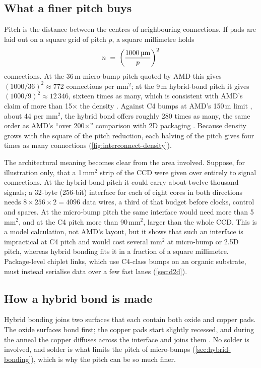 \subsection{What a finer pitch buys}
\label{sec:density-example}
Pitch is the distance between the centres of neighbouring connections. If pads are laid out on a square grid of pitch $p$, a square millimetre holds
\begin{equation}
  n \;=\; \left(\frac{1000\,\text{\textmu m}}{p}\right)^{2}
  \label{eq:pad-density}
\end{equation}
connections. At the 36\,\textmu m micro-bump pitch quoted by AMD this gives $(1000/36)^2 \approx 772$ connections per mm$^2$; at the 9\,\textmu m hybrid-bond pitch it gives $(1000/9)^2 \approx 12\,346$, sixteen times as many, which is consistent with AMD's claim of more than 15$\times$ the density \cite{swaminathanAdvancedPackagingEnabling2021}. Against C4 bumps at AMD's 150\,\textmu m limit \cite[slide~13]{lambertHeterogenousIntegrationHigh2025}, about 44 per mm$^2$, the hybrid bond offers roughly 280 times as many, the same order as AMD's ``over 200$\times$'' comparison with 2D packaging \cite{amd2022epyc7003}. Because density grows with the square of the pitch reduction, each halving of the pitch gives four times as many connections (\cref{fig:interconnect-density}).

The architectural meaning becomes clear from the area involved. Suppose, for illustration only, that a 1\,mm$^2$ strip of the CCD were given over entirely to signal connections. At the hybrid-bond pitch it could carry about twelve thousand signals; a 32-byte (256-bit) interface for each of eight cores in both directions needs $8 \times 256 \times 2 = 4096$ data wires, a third of that budget before clocks, control and spares. At the micro-bump pitch the same interface would need more than 5\,mm$^2$, and at the C4 pitch more than 90\,mm$^2$, larger than the whole CCD. This is a model calculation, not AMD's layout, but it shows that such an interface is impractical at C4 pitch and would cost several mm$^2$ at micro-bump or 2.5D pitch, whereas hybrid bonding fits it in a fraction of a square millimetre. Package-level chiplet links, which use C4-class bumps on an organic substrate, must instead serialise data over a few fast lanes (\cref{sec:d2d}).



\subsection{How a hybrid bond is made}
\label{sec:bond-process}
Hybrid bonding joins two surfaces that each contain both oxide and copper pads. The oxide surfaces bond first; the copper pads start slightly recessed, and during the anneal the copper diffuses across the interface and joins them \cite[slide~9]{alam2ndGeneration3D2024}. No solder is involved, and solder is what limits the pitch of micro-bumps (\cref{sec:hybrid-bonding}), which is why the pitch can be so much finer.

